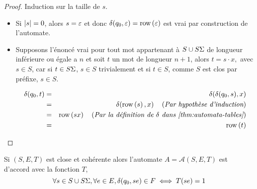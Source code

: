 \begin{proof}
	Induction sur la taille de $s$.
	\begin{itemize}
		\item Si $|s| = 0$, alors $s = \varepsilon$ et donc $\delta(q_0, \varepsilon) = \text{row}\left(\varepsilon\right)$
		      est vrai par construction de l'automate.
		\item Supposons l'énoncé vrai pour tout mot appartenant à $S \cup S\Sigma$ de longueur inférieure ou égale a $n$ et
		      soit $t$ un mot de longueur $n +1$, alors $ t  = s \cdot x,$ avec $s \in S$, car
		      si $t \in S\Sigma$, $s \in S$ trivialement et si $t \in S$, comme $S$ est clos par préfixe, $s \in S$.

		      \begin{eqnarray*}
			      \delta(q_0, t) &=& \delta(\delta(q_0, s), x) \\
			      &=& \delta(\text{row}\left(s\right), x)  \quad\left(\textit{Par hypothèse d'induction}\right) \\
			      &=& \text{row}\left(sx\right)  \quad\left(\textit{Par la définition de $\delta$ dans \ref{thm:automata-tables}}\right) \\
			      &=& \text{row}\left(t\right)
		      \end{eqnarray*}
	\end{itemize}
\end{proof}


\begin{lemma}
	Si $(S,E,T)$ est close et cohérente alors l'automate $A = \mathcal A (S,E,T)$
	est d'accord avec la fonction $T$, \ie
	$$\forall s \in S \cup S\Sigma, \forall e \in E, \delta(q_0,se) \in F \iff T(se) =1$$
\end{lemma}

